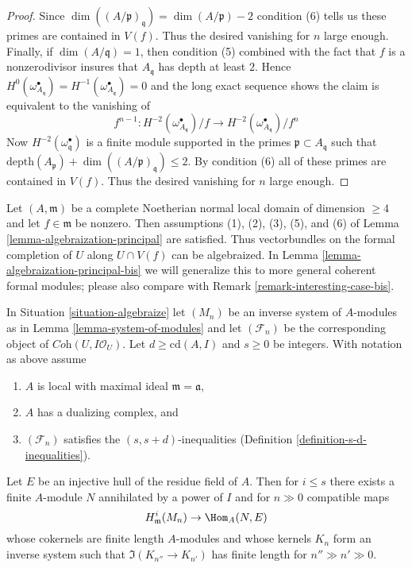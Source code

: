 \begin{proof}
Since $\dim((A/\mathfrak p)_\mathfrak q) = \dim(A/\mathfrak p) - 2$
condition (6) tells us these primes are contained in $V(f)$.
Thus the desired vanishing for $n$ large enough.
Finally, if $\dim(A/\mathfrak q) = 1$, then condition (5) combined
with the fact that $f$ is a nonzerodivisor
insures that $A_\mathfrak q$ has depth at least $2$. Hence
$H^0(\omega_{A_\mathfrak q}^\bullet) =
H^{-1}(\omega_{A_\mathfrak q}^\bullet) = 0$
and the long exact sequence shows the claim is
equivalent to the vanishing of
$$
f^{n - 1} :
H^{-2}(\omega_{A_\mathfrak q}^\bullet)/f \to
H^{-2}(\omega_{A_\mathfrak q}^\bullet)/f^n
$$
Now $H^{-2}(\omega^\bullet_\mathfrak q)$ is a finite
module supported in the primes $\mathfrak p \subset A_\mathfrak q$
such that $\text{depth}(A_\mathfrak p) + \dim((A/\mathfrak p)_\mathfrak q)
\leq 2$. By condition (6) all of these primes are contained in $V(f)$.
Thus the desired vanishing for $n$ large enough.
\end{proof}

\begin{remark}
\label{remark-interesting-case}
Let $(A, \mathfrak m)$ be a complete Noetherian normal local domain
of dimension $\geq 4$ and let $f \in \mathfrak m$ be nonzero.
Then assumptions (1), (2), (3), (5), and (6) of
Lemma \ref{lemma-algebraization-principal}
are satisfied. Thus vectorbundles
on the formal completion of $U$ along $U \cap V(f)$
can be algebraized. In Lemma \ref{lemma-algebraization-principal-bis}
we will generalize this to more general coherent formal modules;
please also compare with Remark \ref{remark-interesting-case-bis}.
\end{remark}

\begin{lemma}
\label{lemma-helper-algebraize}
In Situation \ref{situation-algebraize} let $(M_n)$ be an inverse system of
$A$-modules as in Lemma \ref{lemma-system-of-modules} and let
$(\mathcal{F}_n)$ be the corresponding object of
$\textit{Coh}(U, I\mathcal{O}_U)$. Let $d \geq \text{cd}(A, I)$
and $s \geq 0$ be integers.
With notation as above assume
\begin{enumerate}
\item $A$ is local with maximal ideal $\mathfrak m = \mathfrak a$,
\item $A$ has a dualizing complex, and
\item $(\mathcal{F}_n)$ satisfies the $(s, s + d)$-inequalities
(Definition \ref{definition-s-d-inequalities}).
\end{enumerate}
Let $E$ be an injective hull of the residue field of $A$. Then for $i \leq s$
there exists a finite $A$-module $N$ annihilated by a power
of $I$ and for $n \gg 0$ compatible maps
$$
H^i_\mathfrak m(M_n) \to \Hom_A(N, E)
$$
whose cokernels are finite length $A$-modules and whose kernels $K_n$
form an inverse system such that $\Im(K_{n''} \to K_{n'})$ has finite
length for $n'' \gg n' \gg 0$.
\end{lemma}

